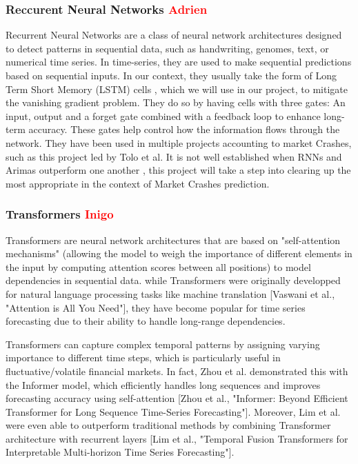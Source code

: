 \documentclass[12pt, letterpaper]{article}
\begin{document}
    \subsubsection*{Reccurent Neural Networks \textcolor{red}{Adrien}}
    Recurrent Neural Networks are a class of neural network architectures designed to detect patterns in sequential data, such as handwriting, genomes, text, or numerical time series. In time-series, they are used to make sequential predictions based on sequential inputs. \cite{Schmidt} In our context, they usually take the form of Long Term Short Memory (LSTM) cells \cite{Hansika}, which we will use in our project, to mitigate the vanishing gradient problem. They do so by having cells with three gates: An input, output and a forget gate combined with a feedback loop to enhance long-term accuracy. These gates help control how the information flows through the network. \cite{Hansika} They have been used in multiple projects accounting to market Crashes, such as this project led by Tolo et al. \cite{Tolo} It is not well established when RNNs and Arimas outperform one another \cite{Hansika}, this project will take a step into clearing up the most appropriate in the context of Market Crashes prediction.

    \subsubsection*{Transformers \textcolor{red}{Inigo}}
Transformers are neural network architectures that are based on "self-attention mechanisms" (allowing the model to weigh the importance of different elements in the input by computing attention scores between all positions) to model dependencies in sequential data. while Transformers were originally developped for natural language processing tasks like machine translation [Vaswani et al., "Attention is All You Need"], they have become popular for time series forecasting due to their ability to handle long-range dependencies.

Transformers can capture complex temporal patterns by assigning varying importance to different time steps, which is particularly useful in fluctuative/volatile financial markets. In fact, Zhou et al. demonstrated this with the Informer model, which efficiently handles long sequences and improves forecasting accuracy using self-attention [Zhou et al., "Informer: Beyond Efficient Transformer for Long Sequence Time-Series Forecasting"]. Moreover, Lim et al. were even able to outperform traditional methods by combining Transformer architecture with recurrent layers [Lim et al., "Temporal Fusion Transformers for Interpretable Multi-horizon Time Series Forecasting"].
\end{document}
